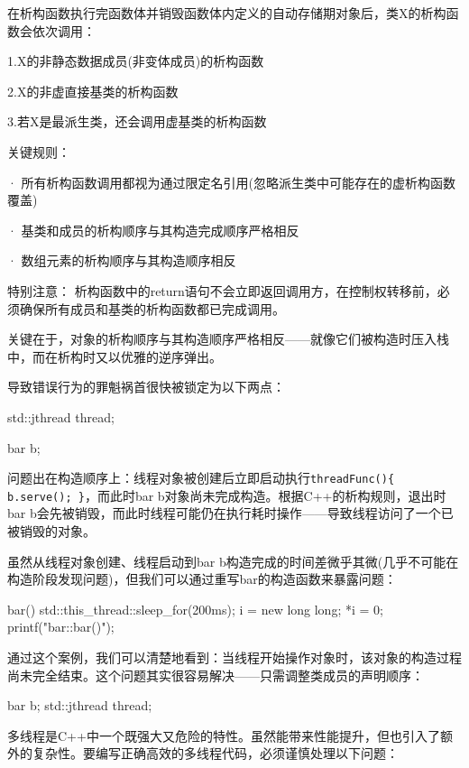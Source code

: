 \begin{shell}
在析构函数执行完函数体并销毁函数体内定义的自动存储期对象后，类X的析构函数会依次调用：

1.X的非静态数据成员(非变体成员)的析构函数

2.X的非虚直接基类的析构函数

3.若X是最派生类，还会调用虚基类的析构函数

关键规则：

· 所有析构函数调用都视为通过限定名引用(忽略派生类中可能存在的虚析构函数覆盖)

· 基类和成员的析构顺序与其构造完成顺序严格相反

· 数组元素的析构顺序与其构造顺序相反

特别注意：
析构函数中的return语句不会立即返回调用方，在控制权转移前，必须确保所有成员和基类的析构函数都已完成调用。
\end{shell}

关键在于，对象的析构顺序与其构造顺序严格相反——就像它们被构造时压入栈中，而在析构时又以优雅的逆序弹出。

导致错误行为的罪魁祸首很快被锁定为以下两点：

\begin{cpp}
std::jthread thread;
\end{cpp}

\begin{cpp}
bar b;
\end{cpp}

问题出在构造顺序上：线程对象被创建后立即启动执行\verb|threadFunc(){ b.serve(); }|，而此时bar b对象尚未完成构造。根据C++的析构规则，退出时bar b会先被销毁，而此时线程可能仍在执行耗时操作——导致线程访问了一个已被销毁的对象。

虽然从线程对象创建、线程启动到bar b构造完成的时间差微乎其微(几乎不可能在构造阶段发现问题)，但我们可以通过重写bar的构造函数来暴露问题：

\begin{cpp}
bar() { std::this_thread::sleep_for(200ms);
  i = new long long; *i = 0; printf("bar::bar()\n ");}
\end{cpp}

通过这个案例，我们可以清楚地看到：当线程开始操作对象时，该对象的构造过程尚未完全结束。这个问题其实很容易解决——只需调整类成员的声明顺序：

\begin{cpp}
bar b;
std::jthread thread;
\end{cpp}

多线程是C++中一个既强大又危险的特性。虽然能带来性能提升，但也引入了额外的复杂性。要编写正确高效的多线程代码，必须谨慎处理以下问题：

